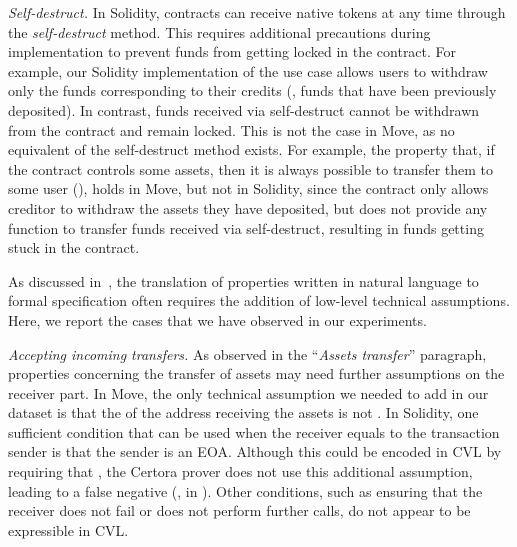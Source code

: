 \emph{Self-destruct.} 
In Solidity, contracts can receive native tokens at any time through the \emph{self-destruct} method. This requires additional precautions during implementation to prevent funds from getting locked in the contract.
For example, our Solidity implementation of the  use case allows users to withdraw only the funds corresponding to their credits (\ie, funds that have been previously deposited). In contrast, funds received via self-destruct cannot be withdrawn from the contract and remain locked.
This is not the case in Move, as no equivalent of the self-destruct method exists.
For example, the property that, if the contract controls some assets, then it is always possible to transfer them  to some user (), holds in Move, but not in Solidity, since the contract only allows creditor to withdraw the assets they have deposited, but  does not  provide any function to transfer funds received via self-destruct, resulting in funds getting stuck in the contract.

 As discussed in~,  the translation of properties written in natural language to formal specification often requires the addition of low-level technical assumptions. Here, we report the cases that we have observed in our experiments.




\emph{Accepting incoming transfers.} As observed in the  ``\emph{Assets transfer}'' paragraph, properties concerning the transfer of assets may need further assumptions on the receiver part. In Move, the only technical assumption we needed to add in our dataset is that the  of the address receiving the assets is not .
In Solidity, one sufficient condition that can be used when the receiver equals to the transaction sender is that the sender is an EOA.
Although this could be encoded in CVL by requiring that 
, the Certora prover does not use this additional assumption, leading to a false negative
(\eg, in ).
Other conditions, such as ensuring that the receiver does not fail or does not perform further calls, do not appear to be expressible in CVL.

